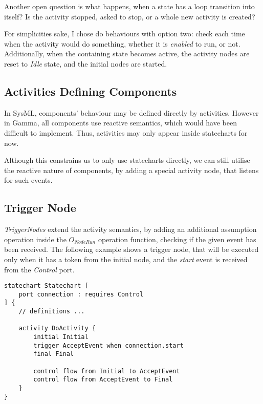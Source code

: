 Another open question is what happens, when a state has a loop transition into itself? Is the activity stopped, asked to stop, or a whole new activity is created?

For simplicities sake, I chose do behaviours with option two: check each time when the activity would do something, whether it is \emph{enabled} to run, or not. Additionally, when the containing state becomes active, the activity nodes are reset to \emph{Idle} state, and the initial nodes are started.

\subsection{Activities Defining Components}

In SysML, components' behaviour may be defined directly by activities. However in Gamma, all components use reactive semantics, which would have been difficult to implement. Thus, activities may only appear inside statecharts for now.

Although this constrains us to only use statecharts directly, we can still utilise the reactive nature of components, by adding a special activity node, that listens for such events.

\subsection{Trigger Node}

\emph{TriggerNodes} extend the activity semantics, by adding an additional assumption operation inside the \(	O_\mathit{NodeRun}\) operation function, checking if the given event has been received. The following example shows a trigger node, that will be executed only when it has a token from the initial node, and the \emph{start} event is received from the \emph{Control} port.
\vspace{6mm}
\begin{lstlisting}[language=statechart]
statechart Statechart [
	port connection : requires Control
] {
	// definitions ...
	
	activity DoActivity {
		initial Initial
		trigger AcceptEvent when connection.start
		final Final
		
		control flow from Initial to AcceptEvent
		control flow from AcceptEvent to Final
	}
}
\end{lstlisting}
